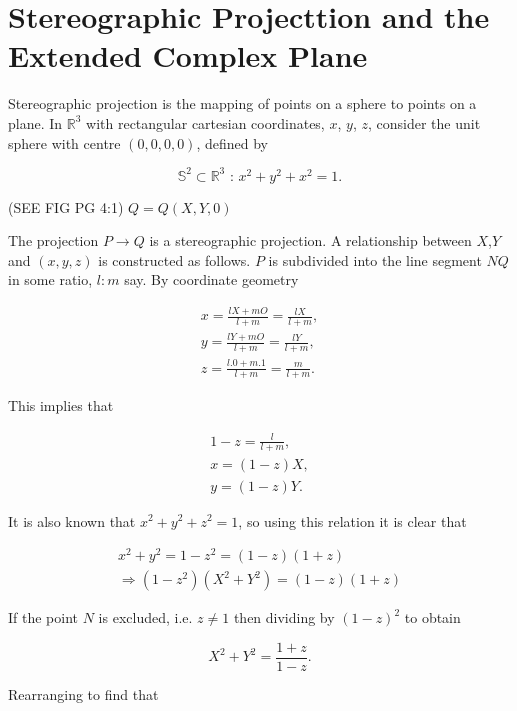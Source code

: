 \section{Stereographic Projecttion and the Extended Complex Plane}\label{Section_Stereographic_Extended_Complex}

Stereographic projection is the mapping of points on a sphere to points on a plane. In $\mathbb{R}^3$ with rectangular cartesian coordinates, $x$, $y$, $z$, consider the unit sphere with centre $(0,0,0,0)$, defined by

\begin{equation*}
\mathbb{S}^2 \subset \mathbb{R}^3 \text{ : } x^2 + y^2 + x^2 = 1.
\end{equation*}

(SEE FIG PG 4:1) $Q = Q(X,Y,0)$

\noindent The projection $P \rightarrow Q$ is a stereographic projection. A relationship between $X$,$Y$ and $(x,y,z)$ is constructed as follows. $P$ is subdivided into the line segment $NQ$ in some ratio, $l:m$ say. By coordinate geometry

\begin{eqnarray*}  
x = \frac{lX + mO}{l+m} = \frac{lX}{l+m}, \\
y = \frac{lY + mO}{l+m} = \frac{lY}{l+m}, \\
z = \frac{l.0+ m.1}{l+m} = \frac{m}{l+m}.
\end{eqnarray*}

\noindent This implies that

\begin{eqnarray*}
1-z = \frac{l}{l+m}, \\
x = (1-z)X, \\
y = (1-z)Y.
\end{eqnarray*}

\noindent It is also known that $x^2+ y^2 +z^2 = 1$, so using this relation it is clear that

\begin{eqnarray*}
x^2 + y^2 = 1-z^2 = (1-z) (1+z) \\
\Rightarrow (1-z^2)(X^2 +Y^2) = (1-z) (1+z)
\end{eqnarray*}

\noindent If the point $N$ is excluded, i.e. $z \neq 1$ then dividing by $(1-z)^2$ to obtain

\begin{equation*} 
X^2 + Y^2 = \frac{1+z}{1-z}.
\end{equation*}

\noindent Rearranging to find that

